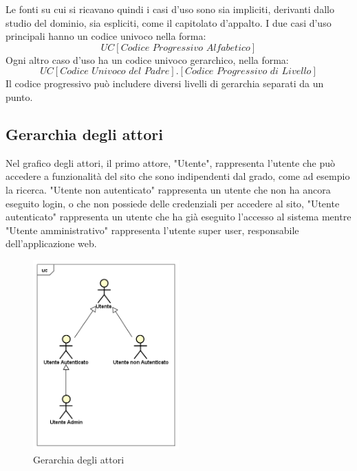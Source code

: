 \documentclass[12pt,a4paper,titlepage]{article}
\begin{document}
	Le fonti su cui si ricavano quindi i casi d'uso sono sia impliciti, derivanti dallo studio del dominio, sia espliciti, come il capitolato d'appalto.
	I due casi d'uso principali hanno un codice univoco nella forma:
	\[UC[\textit{Codice Progressivo Alfabetico}]\]
	Ogni altro caso d'uso ha un codice univoco gerarchico, nella forma: 
	\[UC[\textit{Codice Univoco del Padre}].[\textit{Codice Progressivo di Livello}]\] 
	Il codice progressivo può includere diversi livelli di gerarchia separati da un punto.
	\subsection{Gerarchia degli attori}
	Nel grafico degli attori, il primo attore, "Utente", rappresenta l'utente che può accedere a funzionalità del sito che sono indipendenti dal grado, come ad esempio la ricerca. "Utente non autenticato" rappresenta un utente che non ha ancora eseguito login, o che non possiede delle credenziali per accedere al sito, "Utente autenticato" rappresenta un utente che ha già eseguito l'accesso al sistema mentre "Utente amministrativo" rappresenta l'utente super user, responsabile dell'applicazione web.
	\begin{figure}[ht]
		\centering
		\includegraphics[width=0.5\textwidth]{UseCase/Attori}
		\caption{Gerarchia degli attori}
	\end{figure}
	\clearpage
\end{document}
